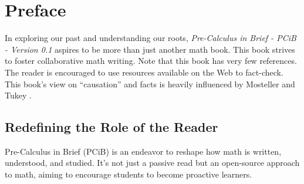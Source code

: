 \documentclass[a4paper,12pt]{book}
\begin{document}
\begin{titlepage}
\end{titlepage}

\tableofcontents
\cleardoublepage

\chapter*{Preface}
In exploring our past and understanding our roots, \emph{Pre-Calculus in Brief - PCiB - Version 0.1} aspires to be more than just another math book. This book strives to foster collaborative math writing. Note that this book has very few references. The reader is encouraged to use resources available on the Web to fact-check. This book's view on ``causation'' and facts is heavily influenced by Mosteller and Tukey \cite{mosteller1977}.

\section*{Redefining the Role of the Reader}
Pre-Calculus in Brief (PCiB) is an endeavor to reshape how math is written, understood, and studied. It's not just a passive read but an open-source approach to math, aiming to encourage students to become proactive learners.
\end{document}
